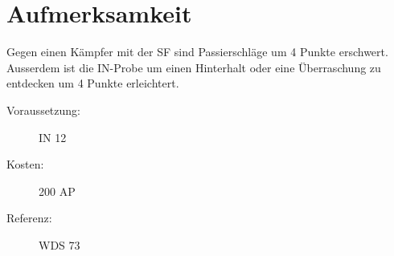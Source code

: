 \section{Aufmerksamkeit}
\label{sf.aufmerksamkeit}
Gegen einen Kämpfer mit der SF  sind Passierschläge um 4 Punkte erschwert.
Ausserdem ist die IN-Probe um einen Hinterhalt oder eine Überraschung zu entdecken um 4 Punkte erleichtert.
\begin{description}
    \item[Voraussetzung:]
        IN 12
    \item [Kosten:]
        200 AP
    \item [Referenz:]
        WDS 73
\end{description}
